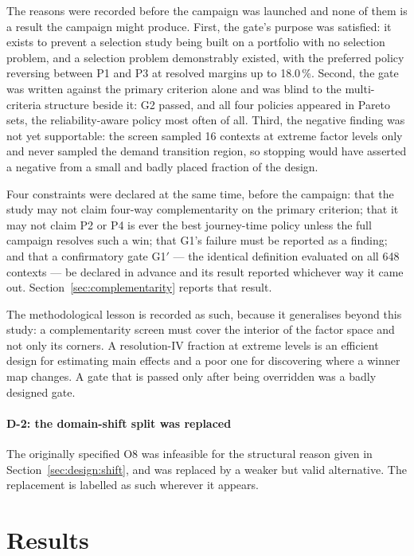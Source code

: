 \documentclass[preprint,12pt]{elsarticle}
\begin{document}
The reasons were recorded before the campaign was launched and none of them is a
result the campaign might produce. First, the gate's purpose was satisfied: it
exists to prevent a selection study being built on a portfolio with no selection
problem, and a selection problem demonstrably existed, with the preferred policy
reversing between P1 and P3 at resolved margins up to 18.0\,\%. Second, the gate
was written against the primary criterion alone and was blind to the
multi-criteria structure beside it: G2 passed, and all four policies appeared in
Pareto sets, the reliability-aware policy most often of all. Third, the negative
finding was not yet supportable: the screen sampled 16 contexts at extreme factor
levels only and never sampled the demand transition region, so stopping would
have asserted a negative from a small and badly placed fraction of the design.

Four constraints were declared at the same time, before the campaign: that the
study may not claim four-way complementarity on the primary criterion; that it
may not claim P2 or P4 is ever the best journey-time policy unless the full
campaign resolves such a win; that G1's failure must be reported as a finding;
and that a confirmatory gate G1$'$ --- the identical definition evaluated on all
648 contexts --- be declared in advance and its result reported whichever way it
came out. Section~\ref{sec:complementarity} reports that result.

The methodological lesson is recorded as such, because it generalises beyond this
study: a complementarity screen must cover the interior of the factor space and
not only its corners. A resolution-IV fraction at extreme levels is an efficient
design for estimating main effects and a poor one for discovering where a winner
map changes. A gate that is passed only after being overridden was a badly
designed gate.

\paragraph{D-2: the domain-shift split was replaced}
The originally specified O8 was infeasible for the structural reason given in
Section~\ref{sec:design:shift}, and was replaced by a weaker but valid
alternative. The replacement is labelled as such wherever it appears.

\section{Results}
\label{sec:results}
\end{document}
